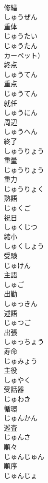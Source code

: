 \documentclass[8pt]{extreport}
\begin{document}
\begin{CJK}{UTF8}{min}
\\	修繕 
\\	しゅうぜん	
\\	重体 
\\	じゅうたい	
\\	じゅうたん 
\\	カーペット）	
\\	終点 
\\	しゅうてん	
\\	重点 
\\	じゅうてん	
\\	就任 
\\	しゅうにん	
\\	周辺 
\\	しゅうへん	
\\	終了 
\\	しゅうりょう	
\\	重量 
\\	じゅうりょう	
\\	重力 
\\	じゅうりょく	
\\	熟語 
\\	じゅくご	
\\	祝日 
\\	しゅくじつ	
\\	縮小 
\\	しゅくしょう	
\\	受験 
\\	じゅけん	
\\	主語 
\\	しゅご	
\\	出勤 
\\	しゅっきん	
\\	述語 
\\	じゅつご	
\\	出張 
\\	しゅっちょう	
\\	寿命 
\\	じゅみょう	
\\	主役 
\\	しゅやく	
\\	受話器 
\\	じゅわき	
\\	循環 
\\	じゅんかん	
\\	巡査 
\\	じゅんさ	
\\	順々 
\\	じゅんじゅん	
\\	順序 
\\	じゅんじょ	

\end{CJK}
\end{document}
